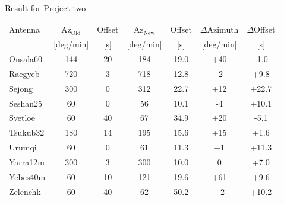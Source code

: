 \documentclass{beamer}
\begin{document}
    \begin{frame}{Result for Project two}
        \tabcolsep=0.15cm
        \begin{tabular}{l | c c | c c | c c}
            Antenna & $\text{Az}_{\text{Old}}$ & Offset & $\text{Az}_{\text{New}}$ & Offset & $\Delta$Azimuth & $\Delta$Offset \\ [-8pt]
                    & \tiny{[deg/min]}& \tiny{[s]}&\tiny{[deg/min]}&\tiny{[s]}&\tiny{[deg/min]}& \tiny{[s]} \\
            \hline
            Onsala60          & 144 &  20 & 184 & 19.0 & +40 & -1.0 \\
            Raegyeb           & 720 &   3 & 718 & 12.8 &  -2 & +9.8 \\
            Sejong            & 300 &   0 & 312 & 22.7 & +12 &+22.7 \\
            Seshan25          &  60 &   0 &  56 & 10.1 &  -4 &+10.1 \\
            Svetloe           &  60 &  40 &  67 & 34.9 & +20 & -5.1 \\
            Tsukub32          & 180 &  14 & 195 & 15.6 & +15 & +1.6 \\
            Urumqi            &  60 &   0 &  61 & 11.3 &  +1 &+11.3 \\
            Yarra12m          & 300 &   3 & 300 & 10.0 &   0 & +7.0 \\
            Yebes40m          &  60 &  10 & 121 & 19.6 & +61 & +9.6 \\
            Zelenchk          &  60 &  40 &  62 & 50.2 &  +2 &+10.2 \\
        \end{tabular}
    \end{frame}
\end{document}
